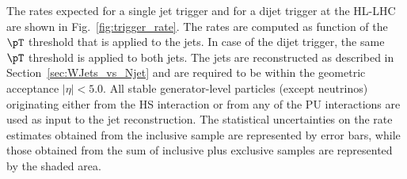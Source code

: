 The rates expected for a single jet trigger and for a dijet trigger at the HL-LHC are shown in Fig.~\ref{fig:trigger_rate}.
The rates are computed as function of the $\pT$ threshold that is applied to the jets. 
In case of the dijet trigger, the same $\pT$ threshold is applied to both jets.
The jets are reconstructed as described in Section~\ref{sec:WJets_vs_Njet}
and are required to be within the geometric acceptance $\vert\eta\vert < 5.0$.
All stable generator-level particles (except neutrinos) originating either from the HS interaction or from any of the PU interactions are used as input to the jet reconstruction.
The statistical uncertainties on the rate estimates obtained from the inclusive sample are represented by error bars,
while those obtained from the sum of inclusive plus exclusive samples are represented by the shaded area.

